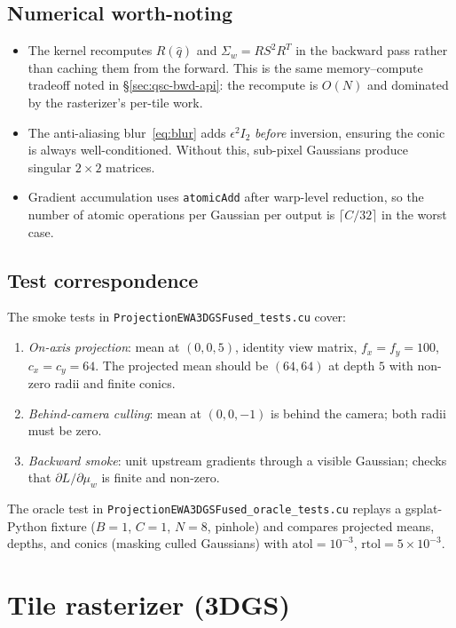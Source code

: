 \documentclass[11pt]{article}
\begin{document}
\subsection{Numerical worth-noting}

\begin{itemize}
  \item The kernel recomputes $R(\hat q)$ and
  $\Sigma_w = R S^2 R^T$ in the backward pass rather than caching
  them from the forward. This is the same memory--compute tradeoff
  noted in \S\ref{sec:qsc-bwd-api}: the recompute is $O(N)$ and
  dominated by the rasterizer's per-tile work.
  \item The anti-aliasing blur~\eqref{eq:blur} adds $\epsilon^2 I_2$
  \emph{before} inversion, ensuring the conic is always
  well-conditioned. Without this, sub-pixel Gaussians produce
  singular $2 \times 2$ matrices.
  \item Gradient accumulation uses \texttt{atomicAdd} after warp-level
  reduction, so the number of atomic operations per Gaussian per
  output is $\lceil C / 32 \rceil$ in the worst case.
\end{itemize}

\subsection{Test correspondence}

The smoke tests in \texttt{ProjectionEWA3DGSFused\_tests.cu} cover:
\begin{enumerate}
  \item \emph{On-axis projection}: mean at $(0, 0, 5)$, identity
  view matrix, $f_x = f_y = 100$, $c_x = c_y = 64$. The projected
  mean should be $(64, 64)$ at depth $5$ with non-zero radii and
  finite conics.
  \item \emph{Behind-camera culling}: mean at $(0, 0, -1)$ is behind
  the camera; both radii must be zero.
  \item \emph{Backward smoke}: unit upstream gradients through a
  visible Gaussian; checks that $\partial L / \partial \mu_w$ is
  finite and non-zero.
\end{enumerate}
The oracle test in \texttt{ProjectionEWA3DGSFused\_oracle\_tests.cu}
replays a gsplat-Python fixture ($B=1$, $C=1$, $N=8$, pinhole) and
compares projected means, depths, and conics (masking culled
Gaussians) with $\text{atol} = 10^{-3}$, $\text{rtol} = 5 \times 10^{-3}$.

\section{Tile rasterizer (3DGS)}
\label{sec:rasterize}
\end{document}
